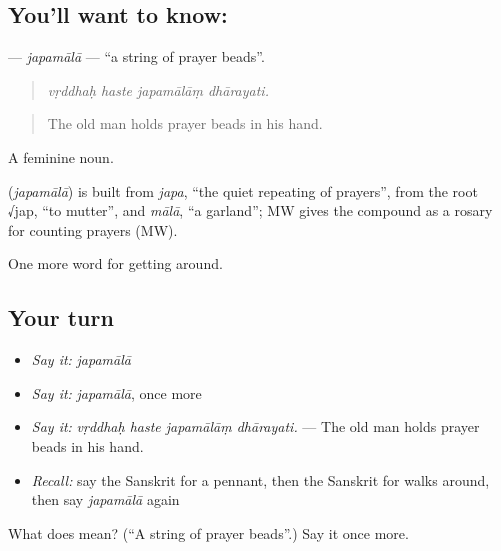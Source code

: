 \subsection*{You'll want to know: }
\textbf{} — \emph{japamālā} — \textquotedblleft{}a string of prayer beads\textquotedblright{}.

\begin{quote}
   
\end{quote}

\begin{quote}
\emph{vṛddhaḥ haste japamālāṃ dhārayati.}
\end{quote}

\begin{quote}
The old man holds prayer beads in his hand.
\end{quote}

A feminine noun.

\begin{cousinweb}
\textbf{} (\emph{japamālā}) is built from \emph{japa}, \textquotedblleft{}the quiet repeating of prayers\textquotedblright{}, from the root √jap, \textquotedblleft{}to mutter\textquotedblright{}, and \emph{mālā}, \textquotedblleft{}a garland\textquotedblright{}; MW gives the compound as a rosary for counting prayers (MW).
\end{cousinweb}

\begin{grammarlens}[title={What you've built}]
One more word for getting around.
\end{grammarlens}

\subsection*{Your turn}
\begin{itemize}
\raggedright
  \item \emph{Say it:} \emph{japamālā}
  \item \emph{Say it:} \emph{japamālā}, once more
  \item \emph{Say it:} \emph{vṛddhaḥ haste japamālāṃ dhārayati.} — The old man holds prayer beads in his hand.
  \item \emph{Recall:} say the Sanskrit for a pennant, then the Sanskrit for walks around, then say \emph{japamālā} again
\end{itemize}

\begin{tcolorbox}[breakable,colback=teal!4,colframe=teal!35!black,title={Before you move on}]
What does  mean? (\textquotedblleft{}A string of prayer beads\textquotedblright{}.) Say it once more.
\end{tcolorbox}
